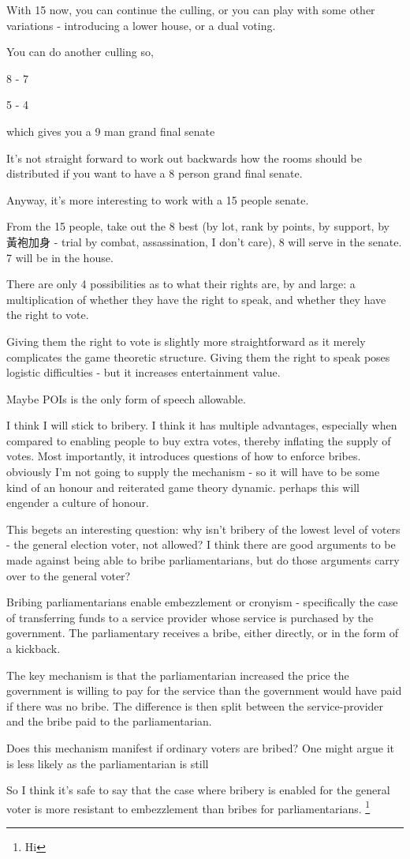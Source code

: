 With 15 now, you can continue the culling, or you can play with some other variations - introducing a lower house, or a dual voting.

You can do another culling so,

8 - 7

5 - 4

which gives you a 9 man grand final senate

It's not straight forward to work out backwards how the rooms should be distributed if you want to have a 8 person grand final senate.

Anyway, it's more interesting to work with a 15 people senate.

From the 15 people, take out the 8 best (by lot, rank by points, by support, by 黃袍加身 - trial by combat, assassination, I don't care), 8 will serve in the senate. 7 will be in the house.

There are only 4 possibilities as to what their rights are, by and large: a multiplication of whether they have the right to speak, and whether they have the right to vote.

Giving them the right to vote is slightly more straightforward as it merely complicates the game theoretic structure. Giving them the right to speak poses logistic difficulties - but it increases entertainment value.

Maybe POIs is the only form of speech allowable.

I think I will stick to bribery. I think it has multiple advantages, especially when compared to enabling people to buy extra votes, thereby inflating the supply of votes. Most importantly, it introduces questions of how to enforce bribes. obviously I'm not going to supply the mechanism - so it will have to be some kind of an honour and reiterated game theory dynamic. perhaps this will engender a culture of honour.

This begets an interesting question: why isn't bribery of the lowest level of voters - the general election voter, not allowed? I think there are good arguments to be made against being able to bribe parliamentarians, but do those arguments carry over to the general voter?

Bribing parliamentarians enable embezzlement or cronyism - specifically the case of transferring funds to a service provider whose service is purchased by the government. The parliamentary receives a bribe, either directly, or in the form of a kickback.

The key mechanism is that the parliamentarian increased the price the government is willing to pay for the service than the government would have paid if there was no bribe. The difference is then split between the service-provider and the bribe paid to the parliamentarian.

Does this mechanism manifest if ordinary voters are bribed? One might argue it is less likely as the parliamentarian is still

So I think it's safe to say that the case where bribery is enabled for the general voter is more resistant to embezzlement than bribes for parliamentarians. \footnote{Hi}